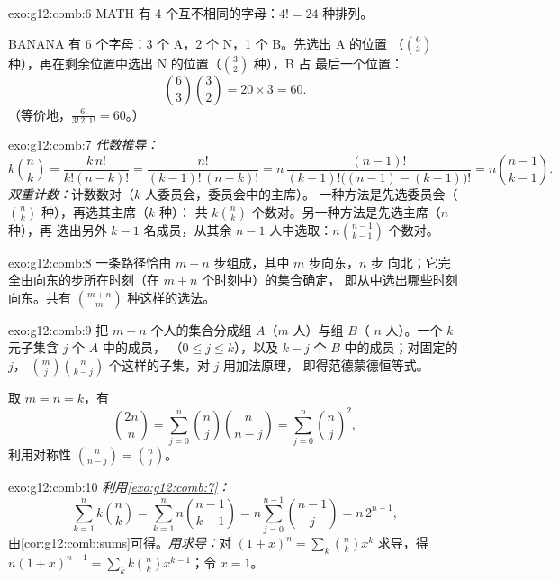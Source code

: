 \begin{solution}{exo:g12:comb:6}
MATH 有 4 个互不相同的字母：$4! = 24$ 种排列。

BANANA 有 6 个字母：3 个 A，2 个 N，1 个 B。先选出 A 的位置
（$\binom63$ 种），再在剩余位置中选出 N 的位置（$\binom32$ 种），B 占
最后一个位置：
\[
\binom{6}{3}\binom{3}{2} = 20 \times 3 = 60 .
\]
（等价地，$\frac{6!}{3!\,2!\,1!} = 60$。）
\end{solution}

\begin{solution}{exo:g12:comb:7}
\emph{代数推导：}
\[
k\binom nk = \frac{k\,n!}{k!(n-k)!} = \frac{n!}{(k-1)!\,(n-k)!}
= n\,\frac{(n-1)!}{(k-1)!\bigl((n-1)-(k-1)\bigr)!} = n\binom{n-1}{k-1}.
\]
\emph{双重计数：}计数数对（$k$ 人委员会，委员会中的主席）。
一种方法是先选委员会（$\binom nk$ 种），再选其主席（$k$ 种）：
共 $k\binom nk$ 个数对。另一种方法是先选主席（$n$ 种），再
选出另外 $k-1$ 名成员，从其余 $n-1$ 人中选取：$n\binom{n-1}{k-1}$ 个数对。
\end{solution}

\begin{solution}{exo:g12:comb:8}
一条路径恰由 $m + n$ 步组成，其中 $m$ 步向东，$n$ 步
向北；它完全由向东的步所在时刻（在 $m+n$ 个时刻中）的集合确定，
即从中选出哪些时刻向东。共有 $\binom{m+n}{m}$ 种这样的选法。
\end{solution}

\begin{solution}{exo:g12:comb:9}
把 $m + n$ 个人的集合分成组 $A$（$m$ 人）与组 $B$（
$n$ 人）。一个 $k$ 元子集含 $j$ 个 $A$ 中的成员，
（$0 \leq j \leq k$），以及 $k - j$ 个 $B$ 中的成员；对固定的 $j$，
$\binom mj \binom{n}{k-j}$ 个这样的子集，对 $j$ 用加法原理，
即得范德蒙德恒等式。

取 $m = n = k$，有
\[
\binom{2n}{n} = \sum_{j=0}^n \binom nj \binom{n}{n-j}
= \sum_{j=0}^n \binom nj^{2},
\]
利用对称性 $\binom{n}{n-j} = \binom nj$。
\end{solution}

\begin{solution}{exo:g12:comb:10}
\emph{利用\cref{exo:g12:comb:7}：}
\[
\sum_{k=1}^n k\binom nk = \sum_{k=1}^n n\binom{n-1}{k-1}
= n\sum_{j=0}^{n-1}\binom{n-1}{j} = n\,2^{n-1},
\]
由\cref{cor:g12:comb:sums}可得。\emph{用求导：}对
$(1+x)^n = \sum_k \binom nk x^k$ 求导，得
$n(1+x)^{n-1} = \sum_k k \binom nk x^{k-1}$；令 $x = 1$。
\end{solution}

